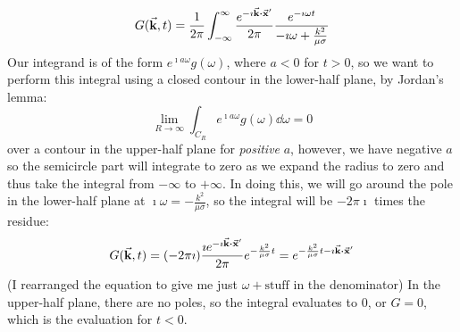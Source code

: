 \documentclass[a4paper,twoside]{article}
\begin{document}
\begin{itemize}
\begin{problem}
            \begin{equation}
                G( \va{k},t) = \frac{1}{2 \pi} \int_{- \infty}^{\infty} \frac{e^{- \imath \va{k} \vdot \va{x}'}}{2 \pi} \frac{e^{- \imath \omega t}}{-\imath \omega + \frac{k^2}{\mu \sigma}}
            \end{equation}
            Our integrand is of the form $ e^{\imath a \omega} g(\omega) $, where $ a < 0 $ for $ t > 0 $, so we want to perform this integral using a closed contour in the lower-half plane, by Jordan's lemma:
            \begin{equation}
                \lim_{R \to \infty} \int_{C_R} e^{\imath a \omega} g(\omega) \dd{\omega} = 0
            \end{equation}
            over a contour in the upper-half plane for \textit{positive} $ a $, however, we have negative $ a $ so the semicircle part will integrate to zero as we expand the radius to zero and thus take the integral from $ - \infty $ to $ + \infty $. In doing this, we will go around the pole in the lower-half plane at $ \imath \omega = - \frac{k^2}{\mu \sigma} $, so the integral will be $ - 2 \pi \imath $ times the residue:
            \begin{equation}
                G( \va{k},t) = (- 2 \pi \imath) \frac{\imath e^{- \imath \va{k} \vdot \va{x}'}}{2 \pi} e^{- \frac{k^2}{\mu \sigma} t} = e^{- \frac{k^2}{\mu \sigma} t - \imath \va{k} \vdot \va{x}'}
            \end{equation}
            (I rearranged the equation to give me just $ \omega + \text{stuff} $ in the denominator)
            In the upper-half plane, there are no poles, so the integral evaluates to $ 0 $, or $ G = 0 $, which is the evaluation for $ t < 0 $.
            

\end{problem}
\end{itemize}
\end{document}
